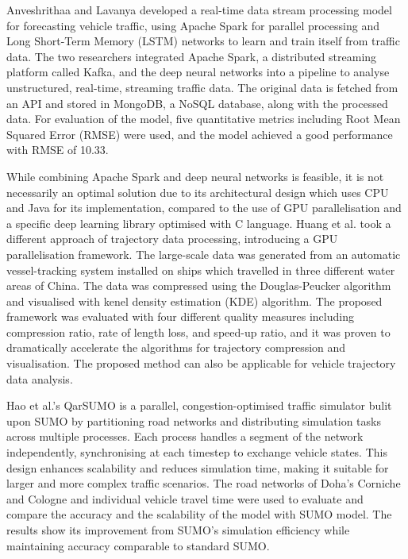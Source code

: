 \documentclass[11pt]{uonthesis}
\begin{document}
Anveshrithaa and Lavanya\cite{9077707} developed a real-time data stream processing model for forecasting vehicle traffic, using Apache Spark for parallel processing and Long Short-Term Memory (LSTM) networks to learn and train itself from traffic data. The two researchers integrated Apache Spark, a distributed streaming platform called Kafka, and the deep neural networks into a pipeline to analyse unstructured, real-time, streaming traffic data. The original data is fetched from an API and stored in MongoDB, a NoSQL database, along with the processed data. For evaluation of the model, five quantitative metrics including Root Mean Squared Error (RMSE) were used, and the model achieved a good performance with RMSE of 10.33. 

While combining Apache Spark and deep neural networks is feasible, it is not necessarily an optimal solution due to its architectural design which uses CPU and Java for its implementation, compared to the use of GPU parallelisation and a specific deep learning library optimised with C language. Huang et al.\cite{9075295} took a different approach of trajectory data processing, introducing a GPU parallelisation framework. The large-scale data was generated from an automatic vessel-tracking system installed on ships which travelled in three different water areas of China. The data was compressed using the Douglas-Peucker algorithm and visualised with kenel density estimation (KDE) algorithm. The proposed framework was evaluated with four different quality measures including compression ratio, rate of length loss, and speed-up ratio, and it was proven to dramatically accelerate the algorithms for trajectory compression and visualisation. The proposed method can also be applicable for vehicle trajectory data analysis.

Hao et al.'s QarSUMO\cite{10.1145/3397536.3422274} is a parallel, congestion-optimised traffic simulator bulit upon SUMO by partitioning road networks and distributing simulation tasks across multiple processes. Each process handles a segment of the network independently, synchronising at each timestep to exchange vehicle states. This design enhances scalability and reduces simulation time, making it suitable for larger and more complex traffic scenarios. The road networks of Doha's Corniche and Cologne and individual vehicle travel time were used to evaluate and compare the accuracy and the scalability of the model with SUMO model. The results show its improvement from SUMO's simulation efficiency while maintaining accuracy comparable to standard SUMO.
\end{document}
